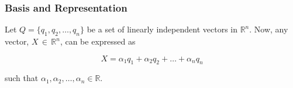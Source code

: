 \subsubsection{Basis and Representation}

Let $Q = \{q_1, q_2, \ldots, q_n \}$ be a set of linearly independent vectors in
$\mathbb{R}^n$. Now, any vector, $X \, \in \, \mathbb{R}^n$, can be expressed
as

\begin{equation} \label{eq:linear_combo_vector}
X = \alpha_1 q_1 + \alpha_2 q_2 + \ldots + \alpha_n q_n
\end{equation}

\noindent such that $\alpha_1, \alpha_2, \ldots, \alpha_n \in \mathbb{R}$.
